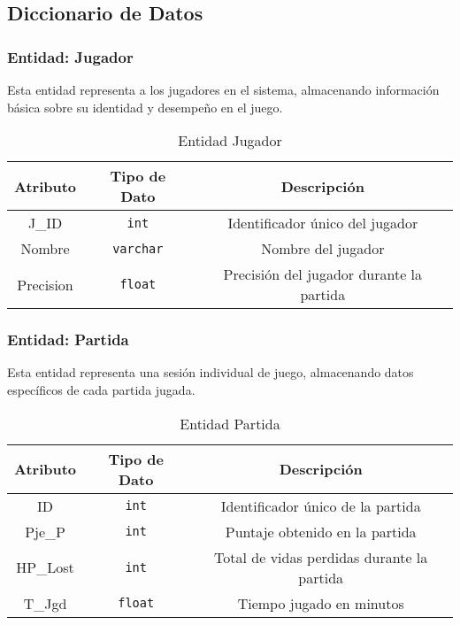 \subsection{Diccionario de Datos}

\subsubsection{Entidad: Jugador}
Esta entidad representa a los jugadores en el sistema, almacenando información básica sobre su identidad y desempeño en el juego.
\begin{table}[H]
\centering
\begin{tabular}{|c|c|c|}
\hline
\textbf{Atributo} & \textbf{Tipo de Dato} & \textbf{Descripción} \\ \hline
J\_ID & \texttt{int} & Identificador único del jugador \\ \hline
Nombre & \texttt{varchar} & Nombre del jugador \\ \hline
Precision & \texttt{float} & Precisión del jugador durante la partida \\ \hline
\end{tabular}
\caption{Entidad Jugador}
\end{table}

\subsubsection{Entidad: Partida}
Esta entidad representa una sesión individual de juego, almacenando datos específicos de cada partida jugada.
\begin{table}[H]
\centering
\begin{tabular}{|c|c|c|}
\hline
\textbf{Atributo} & \textbf{Tipo de Dato} & \textbf{Descripción} \\ \hline
ID & \texttt{int} & Identificador único de la partida \\ \hline
Pje\_P & \texttt{int} & Puntaje obtenido en la partida \\ \hline
HP\_Lost & \texttt{int} & Total de vidas perdidas durante la partida \\ \hline
T\_Jgd & \texttt{float} & Tiempo jugado en minutos \\ \hline
\end{tabular}
\caption{Entidad Partida}
\end{table}

